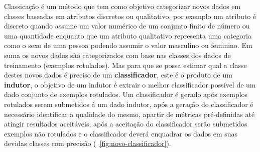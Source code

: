 Classicação é um método que tem como objetivo categorizar novos dados em classes baseadas em atributos discretos ou qualitativo,
por exemplo um atributo é discreto quando assume um valor numérico de um conjunto finito de número ou uma quantidade enquanto que um
atributo qualitativo representa uma categoria como o sexo de uma pessoa podendo assumir o valor masculino ou feminino.
Em suma os novos dados são categorizados com base nas classes dos dados de treinamento (exemplos rotulados). 
Mas para que se possa estimar qual a classe destes novos dados é preciso de um \textbf{classificador},
este é o produto de um \textbf{indutor}, o objetivo de um indutor é extrair o melhor classificador possível de um dado 
conjunto de exemplos rotulados.
Um classificador é gerado após exemplos rotulados serem submetidos á um dado indutor, após a geração do classificador 
é necessário identificar a qualidade do mesmo, apartir de métricas pré-definidas até atingir resultados aceitáveis, após a aceitação do classificador 
serão submetidos exemplos não rotulados e o classificador deverá enquadrar os dados em suas devidas classes com precisão (~\autoref{fig:novo-classificador}). 
\begin{figure}[htb!]
	\centering
\end{figure}  

